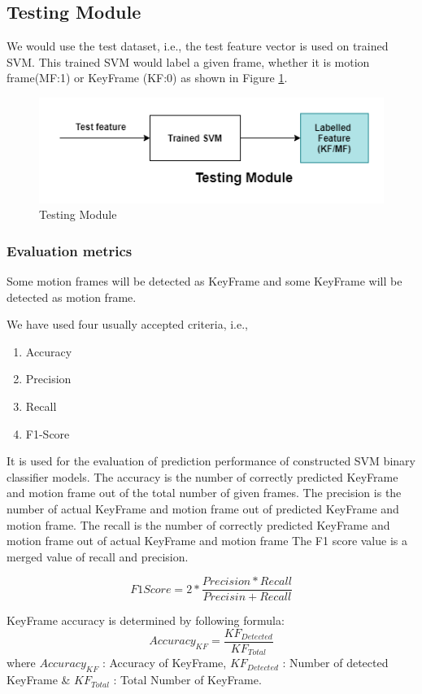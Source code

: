     
    
 \subsection{Testing Module}
We would use the test dataset, i.e., the test feature vector is used on trained SVM. This trained SVM would label a given frame, whether it is motion frame(MF:1) or KeyFrame (KF:0) as shown in Figure \ref{fig:Ch04F013}.

 \begin{figure}[H]
  \includegraphics[scale= 0.7]{./Pictures/Algorithm-Testing_Module.png}
  \caption{Testing Module}
  \label{fig:Ch04F013}
\end{figure}
 
 \subsubsection{Evaluation metrics}
Some motion frames will be detected as KeyFrame and some KeyFrame will be detected as motion frame.

We have used four usually accepted criteria, i.e.,
\begin{enumerate}
    \item Accuracy
    \item Precision
    \item Recall
    \item F1-Score
\end{enumerate}
It is used for the evaluation of prediction performance of constructed SVM binary classifier models. The accuracy is the number of correctly predicted KeyFrame and motion frame out of the total number of given frames. The precision is the number of actual KeyFrame and motion frame out of predicted KeyFrame and motion frame.
The recall is the number of correctly predicted KeyFrame and motion frame out of actual KeyFrame and motion frame
The F1 score value is a merged value of recall and precision.



\textbf{\[F1Score = 2* \frac{Precision * Recall}{Precisin + Recall} \]}

KeyFrame accuracy is determined by following formula:
\[Accuracy_{KF} = \frac{KF_{Detected}}{KF_{Total}}\]
where $Accuracy_{KF}$ : Accuracy of KeyFrame,\newline 
$KF_{Detected}$ : Number of detected KeyFrame \& \newline
$KF_{Total}$ : Total Number of KeyFrame.\newline

